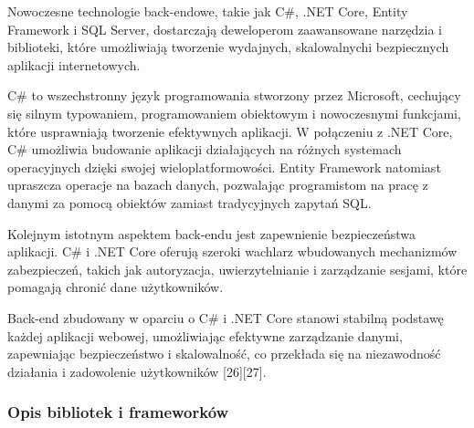 Nowoczesne technologie back-endowe, takie jak C\#, .NET Core, Entity Framework i SQL Server, dostarczają deweloperom zaawansowane narzędzia i biblioteki, które umożliwiają tworzenie wydajnych, skalowalnych\linebreak i bezpiecznych aplikacji internetowych.

C\# to wszechstronny język programowania stworzony przez Microsoft, cechujący się silnym typowaniem, programowaniem obiektowym i nowoczesnymi funkcjami, które usprawniają tworzenie efektywnych aplikacji. W połączeniu z .NET Core, C\# umożliwia budowanie aplikacji działających na różnych systemach operacyjnych dzięki swojej wieloplatformowości. Entity Framework natomiast upraszcza operacje na bazach danych, pozwalając programistom na pracę z danymi za pomocą obiektów zamiast tradycyjnych zapytań SQL.

Kolejnym istotnym aspektem back-endu jest zapewnienie bezpieczeństwa aplikacji. C\# i .NET Core oferują szeroki wachlarz wbudowanych mechanizmów zabezpieczeń, takich jak autoryzacja, uwierzytelnianie i zarządzanie sesjami, które pomagają chronić dane użytkowników. 

Back-end zbudowany w oparciu o C\# i .NET Core stanowi stabilną podstawę każdej aplikacji webowej, umożliwiając efektywne zarządzanie danymi, zapewniając bezpieczeństwo i skalowalność, co przekłada się na niezawodność działania i zadowolenie użytkowników [26][27].
\subsubsection{Opis bibliotek i frameworków}

